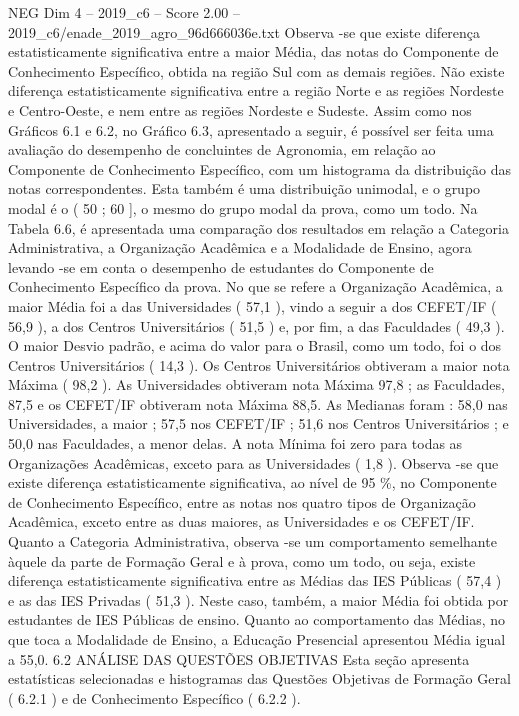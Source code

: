 \begin{textsample}{NEG Dim 4 – 2019\_c6 – Score 2.00 – 2019\_c6/enade\_2019\_agro\_96d666036e.txt}
Observa -se que existe diferença estatisticamente significativa entre a maior Média, das notas do Componente de Conhecimento Específico, obtida na região Sul com as demais regiões.
Não existe diferença estatisticamente significativa entre a região Norte e as regiões Nordeste e Centro-Oeste, e nem entre as regiões Nordeste e Sudeste.
Assim como nos Gráficos 6.1 e 6.2, no Gráfico 6.3, apresentado a seguir, é possível ser feita uma avaliação do desempenho de concluintes de Agronomia, em relação ao Componente de Conhecimento Específico, com um histograma da distribuição das notas correspondentes.
Esta também é uma distribuição unimodal, e o grupo modal é o ( 50 ; 60 ], o mesmo do grupo modal da prova, como um todo.
Na Tabela 6.6, é apresentada uma comparação dos resultados em relação a Categoria Administrativa, a Organização Acadêmica e a Modalidade de Ensino, agora levando -se em conta o desempenho de estudantes do Componente de Conhecimento Específico da prova.
No que se refere a Organização Acadêmica, a maior Média foi a das Universidades ( 57,1 ), vindo a seguir a dos CEFET/IF ( 56,9 ), a dos Centros Universitários ( 51,5 ) e, por fim, a das Faculdades ( 49,3 ).
O maior Desvio padrão, e acima do valor para o Brasil, como um todo, foi o dos Centros Universitários ( 14,3 ).
Os Centros Universitários obtiveram a maior nota Máxima ( 98,2 ).
As Universidades obtiveram nota Máxima 97,8 ; as Faculdades, 87,5 e os CEFET/IF obtiveram nota Máxima 88,5.
As Medianas foram : 58,0 nas Universidades, a maior ; 57,5 nos CEFET/IF ; 51,6 nos Centros Universitários ; e 50,0 nas Faculdades, a menor delas.
A nota Mínima foi zero para todas as Organizações Acadêmicas, exceto para as Universidades ( 1,8 ).
Observa -se que existe diferença estatisticamente significativa, ao nível de 95 \%, no Componente de Conhecimento Específico, entre as notas nos quatro tipos de Organização Acadêmica, exceto entre as duas maiores, as Universidades e os CEFET/IF.
Quanto a Categoria Administrativa, observa -se um comportamento semelhante àquele da parte de Formação Geral e à prova, como um todo, ou seja, existe diferença estatisticamente significativa entre as Médias das IES Públicas ( 57,4 ) e as das IES Privadas ( 51,3 ).
Neste caso, também, a maior Média foi obtida por estudantes de IES Públicas de ensino.
Quanto ao comportamento das Médias, no que toca a Modalidade de Ensino, a Educação Presencial apresentou Média igual a 55,0. 6.2 ANÁLISE DAS QUESTÕES OBJETIVAS Esta seção apresenta estatísticas selecionadas e histogramas das Questões Objetivas de Formação Geral ( 6.2.1 ) e de Conhecimento Específico ( 6.2.2 ).

\end{textsample}
